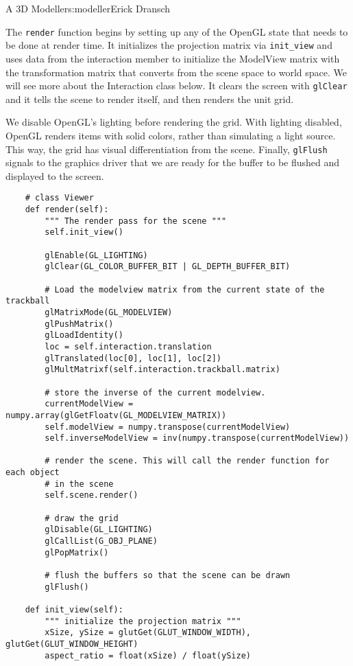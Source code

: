 \begin{aosachapter}{A 3D Modeller}{s:modeller}{Erick Dransch}
\label{rendering-with-the-viewer}

The \texttt{render} function begins by setting up any of the OpenGL
state that needs to be done at render time. It initializes the
projection matrix via \texttt{init\_view} and uses data from the
interaction member to initialize the ModelView matrix with the
transformation matrix that converts from the scene space to world space.
We will see more about the Interaction class below. It clears the screen
with \texttt{glClear} and it tells the scene to render itself, and then
renders the unit grid.

We disable OpenGL's lighting before rendering the grid. With lighting
disabled, OpenGL renders items with solid colors, rather than simulating
a light source. This way, the grid has visual differentiation from the
scene. Finally, \texttt{glFlush} signals to the graphics driver that we
are ready for the buffer to be flushed and displayed to the screen.

\begin{verbatim}
    # class Viewer
    def render(self):
        """ The render pass for the scene """
        self.init_view()

        glEnable(GL_LIGHTING)
        glClear(GL_COLOR_BUFFER_BIT | GL_DEPTH_BUFFER_BIT)

        # Load the modelview matrix from the current state of the trackball
        glMatrixMode(GL_MODELVIEW)
        glPushMatrix()
        glLoadIdentity()
        loc = self.interaction.translation
        glTranslated(loc[0], loc[1], loc[2])
        glMultMatrixf(self.interaction.trackball.matrix)

        # store the inverse of the current modelview.
        currentModelView = numpy.array(glGetFloatv(GL_MODELVIEW_MATRIX))
        self.modelView = numpy.transpose(currentModelView)
        self.inverseModelView = inv(numpy.transpose(currentModelView))

        # render the scene. This will call the render function for each object
        # in the scene
        self.scene.render()

        # draw the grid
        glDisable(GL_LIGHTING)
        glCallList(G_OBJ_PLANE)
        glPopMatrix()

        # flush the buffers so that the scene can be drawn
        glFlush()

    def init_view(self):
        """ initialize the projection matrix """
        xSize, ySize = glutGet(GLUT_WINDOW_WIDTH), glutGet(GLUT_WINDOW_HEIGHT)
        aspect_ratio = float(xSize) / float(ySize)


\end{verbatim}
\end{aosachapter}
